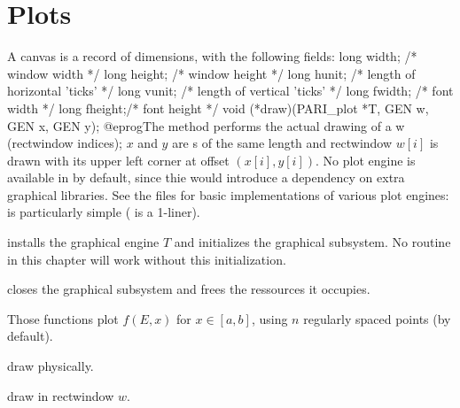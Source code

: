 



\newpage

\chapter{Plots}

A  canvas is a record of dimensions, with the following fields:
\bprog
  long width;  /* window width */
  long height; /* window height */
  long hunit;  /* length of horizontal 'ticks' */
  long vunit;  /* length of vertical 'ticks' */
  long fwidth; /* font width */
  long fheight;/* font height */
  void (*draw)(PARI_plot *T, GEN w, GEN x, GEN y);
@eprog\noindent The  method performs the actual drawing of
a  w (rectwindow indices); $x$ and $y$ are s
of the same length and rectwindow $w[i]$ is drawn with its upper left
corner at offset $(x[i],y[i])$. No plot engine is available in 
by default, since thie would introduce a dependency on extra graphical
libraries. See the files  for basic implementations of
various plot engines:  is particularly simple ( is a
1-liner).

 installs the
graphical engine $T$ and initializes the graphical subsystem. No routine in
this chapter will work without this initialization.

 closes the graphical subsystem and
frees the ressources it occupies.

Those functions plot $f(E,x)$ for $x\in [a,b]$, using $n$ regularly spaced
points (by default).

 draw physically.

 draw in rectwindow $w$.




